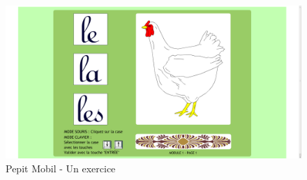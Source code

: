 \begin{figure}[H]
\begin{center}
\includegraphics[width=15cm]{images/pepit_be_practice}
\end{center}
\caption{Pepit Mobil - Un exercice}
\label{Pepit Mobil - Un exercice}
\end{figure}
